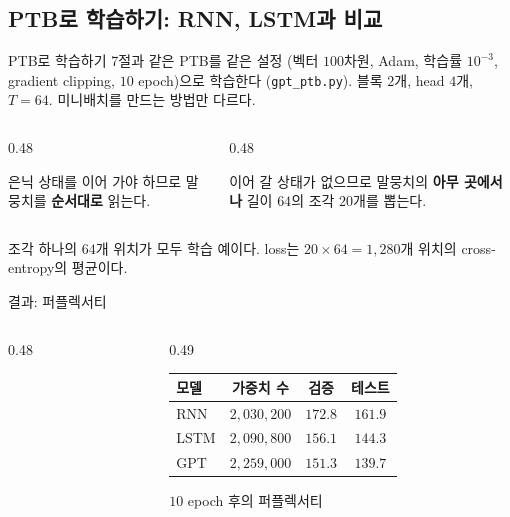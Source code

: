 \documentclass[aspectratio=169,11pt]{beamer}
\begin{document}
\subsection{PTB로 학습하기: RNN, LSTM과 비교}

\begin{frame}{PTB로 학습하기}
7절과 같은 PTB를 같은 설정 (벡터 $100$차원, Adam, 학습률 $10^{-3}$, gradient clipping,
$10$ epoch)으로 학습한다 (\texttt{gpt\_ptb.py}). 블록 $2$개, head $4$개, $T=64$.
\vskip2mm
미니배치를 만드는 방법만 다르다.
\vskip1mm
\begin{columns}[T,onlytextwidth]
\begin{column}{0.48\textwidth}
\begin{remarkbox}
은닉 상태를 이어 가야 하므로 말뭉치를 \textbf{순서대로} 읽는다.
\end{remarkbox}
\end{column}
\begin{column}{0.48\textwidth}
\begin{keybox}[GPT]
이어 갈 상태가 없으므로 말뭉치의 \textbf{아무 곳에서나} 길이 $64$의 조각 $20$개를 뽑는다.
\end{keybox}
\end{column}
\end{columns}
\vskip2mm
조각 하나의 $64$개 위치가 모두 학습 예이다.
loss는 $20\times64=1{,}280$개 위치의 cross-entropy의 평균이다.
\end{frame}

\begin{frame}{결과: 퍼플렉서티}
\begin{columns}[c,onlytextwidth]
\begin{column}{0.48\textwidth}
\end{column}
\begin{column}{0.49\textwidth}
\small
\begin{tabular}{@{}lccc@{}}
\toprule
모델 & 가중치 수 & 검증 & 테스트 \\
\midrule
RNN & $2{,}030{,}200$ & $172.8$ & $161.9$ \\
LSTM & $2{,}090{,}800$ & $156.1$ & $144.3$ \\
GPT & $2{,}259{,}000$ & $151.3$ & $139.7$ \\
\bottomrule
\end{tabular}
\vskip1mm
{\footnotesize $10$ epoch 후의 퍼플렉서티\par}
\end{column}
\end{columns}
\end{frame}
\end{document}
